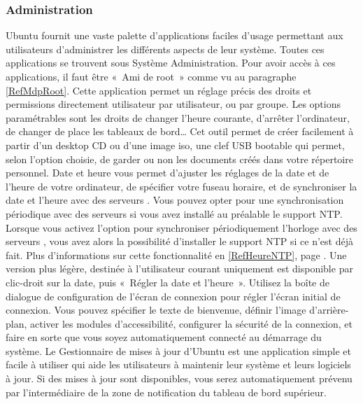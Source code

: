 \subsubsection{Administration}
Ubuntu fournit une vaste palette d'applications faciles d'usage permettant aux utilisateurs d'administrer les différents aspects de leur système. Toutes ces applications se trouvent sous Système \FlecheDroite Administration. Pour avoir accès à ces applications, il faut être «~Ami de root~» comme vu au paragraphe \ref{RefMdpRoot}.
Cette application permet un réglage précis des droits et permissions directement utilisateur par utilisateur, ou par groupe. Les options paramétrables sont les droits de changer l'heure courante, d'arrêter l'ordinateur, de changer de place les tableaux de bord\ldots{}
Cet outil permet de créer facilement à partir d'un desktop CD ou d'une image iso, une clef USB bootable qui permet, selon l'option choisie, de garder ou non les documents créés dans votre répertoire personnel.
Date et heure vous permet d'ajuster les réglages de la date et de l'heure de votre ordinateur, de spécifier votre fuseau horaire, et de synchroniser la date et l'heure avec des serveurs . Vous pouvez opter pour une synchronisation périodique avec des serveurs  si vous avez installé au préalable le support NTP. Lorsque vous activez l'option pour synchroniser périodiquement l'horloge avec des serveurs , vous avez alors la possibilité d'installer le support NTP si ce n'est déjà fait. Plus d'informations sur cette fonctionnalité en \ref{RefHeureNTP}, page \pageref{RefHeureNTP}. Une version plus légère, destinée à l'utilisateur courant uniquement est disponible par clic-droit sur la date, puis «~Régler la date et l'heure~».
Utilisez la boîte de dialogue de configuration de l'écran de connexion pour régler l'écran initial de connexion. Vous pouvez spécifier le texte de bienvenue, définir l'image d'arrière-plan, activer les modules d'accessibilité, configurer la sécurité de la connexion, et faire en sorte que vous soyez automatiquement connecté au démarrage du système.
Le Gestionnaire de mises à jour d'Ubuntu est une application simple et facile à utiliser qui aide les utilisateurs à maintenir leur système et leurs logiciels à jour. Si des mises à jour sont disponibles, vous serez automatiquement prévenu par l'intermédiaire de la zone de notification du tableau de bord supérieur.
